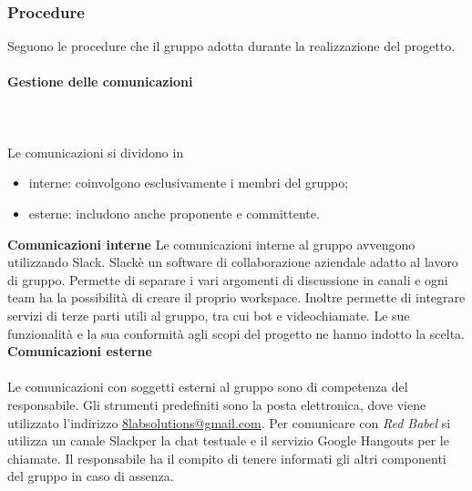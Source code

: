 		\subsubsection{Procedure}
		Seguono le procedure che il gruppo adotta durante la realizzazione del progetto. 
			\paragraph{Gestione delle comunicazioni} \mbox{}\\ \mbox{}\\
			
			Le comunicazioni si dividono in
			\begin{itemize}
				\item interne: coinvolgono esclusivamente i membri del gruppo;
				\item esterne: includono anche proponente e committente.
			\end{itemize}
			\textbf{Comunicazioni interne} \newline \newline
			Le comunicazioni interne al gruppo avvengono utilizzando Slack\glo. Slack\glosp è un software di collaborazione aziendale adatto al lavoro di gruppo. Permette di separare i vari argomenti di discussione in canali e ogni team ha la possibilità di creare il proprio workspace. Inoltre permette di integrare servizi di terze parti utili al gruppo, tra cui bot e videochiamate. Le sue funzionalità e la sua conformità agli scopi del progetto ne hanno indotto la scelta. \newline \newline
			\textbf{Comunicazioni esterne} \mbox{}\\ \mbox{}\\
			Le comunicazioni con soggetti esterni al gruppo sono di competenza del responsabile. Gli strumenti predefiniti sono la posta elettronica, dove viene utilizzato l'indirizzo \href{mailto:8labsolutions@gmail.com}{8labsolutions@gmail.com}.
			Per comunicare con \textit{Red Babel} si utilizza un canale Slack\glosp per la chat testuale e il servizio Google Hangouts per le chiamate. Il responsabile ha il compito di tenere informati gli altri componenti del gruppo in caso di assenza.
			\newline
